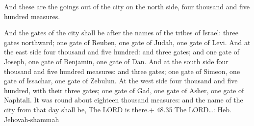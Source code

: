  And these are the goings out of the city on the north
side, four thousand and five hundred measures.

 And the gates of the city shall be after the names of the
tribes of Israel: three gates northward; one gate of Reuben, one gate of
Judah, one gate of Levi.  And at the east side four
thousand and five hundred: and three gates; and one gate of Joseph, one
gate of Benjamin, one gate of Dan.  And at the south side
four thousand and five hundred measures: and three gates; one gate of
Simeon, one gate of Issachar, one gate of Zebulun.  At the
west side four thousand and five hundred, with their three gates; one
gate of Gad, one gate of Asher, one gate of Naphtali.  It
was round about eighteen thousand measures: and the name of the city
from that day shall be, The LORD is there.+ 48.35 The LORD\ldots: Heb.
Jehovah-shammah
